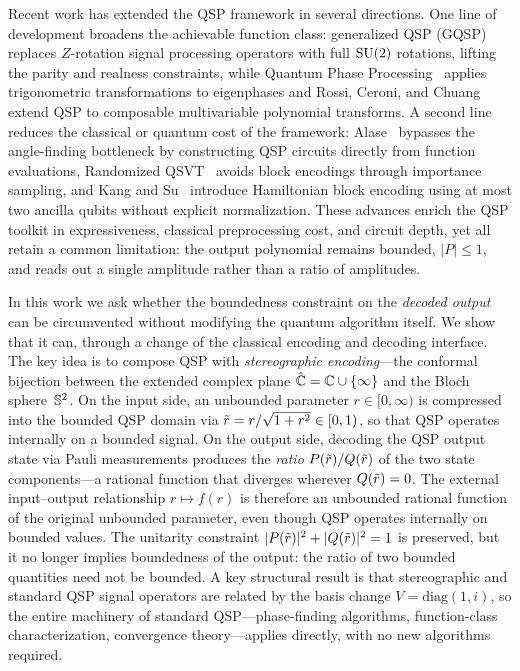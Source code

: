 
Recent work has extended the QSP framework in several directions.  One
line of development broadens the achievable function class: generalized
QSP (GQSP)~\cite{MotlaghWiebe2023} replaces $Z$-rotation signal
processing operators with full $\mathrm{SU}(2)$ rotations, lifting the parity
and realness constraints, while Quantum Phase
Processing~\cite{WangZhangYuWang2023} applies trigonometric
transformations to eigenphases and Rossi, Ceroni, and
Chuang~\cite{RossiCeroniChuang2025} extend QSP to composable
multivariable polynomial transforms.  A second line reduces the
classical or quantum cost of the framework:
Alase~\cite{Alase2025} bypasses the angle-finding bottleneck by
constructing QSP circuits directly from function evaluations,
Randomized QSVT~\cite{WangZhangHazraEtAl2025} avoids block encodings
through importance sampling, and Kang and Su~\cite{KangSu2025}
introduce Hamiltonian block encoding using at most two ancilla qubits
without explicit normalization.  These advances enrich the QSP toolkit
in expressiveness, classical preprocessing cost, and circuit depth,
yet all retain a common limitation: the output polynomial
remains bounded, $|P| \leq 1$, and reads out a single amplitude
rather than a ratio of amplitudes.


In this work we ask whether the boundedness constraint on the
\emph{decoded output} can be circumvented without modifying the
quantum algorithm itself.  We show that it can, through a change
of the classical encoding and decoding interface.
The key idea is to compose QSP with \emph{stereographic encoding}---the
conformal bijection between the extended complex plane
$\hat{\mathbb{C}} = \mathbb{C} \cup \{\infty\}$ and the Bloch
sphere~$\mathbb{S}^2$.  On the input side, an unbounded parameter
$r \in [0,\infty)$ is compressed into the bounded QSP domain via
$\tilde{r} = r/\sqrt{1+r^2} \in [0,1)$, so that QSP operates
internally on a bounded signal.  On the output side, decoding the QSP
output state via Pauli measurements produces the \emph{ratio}
$P(\tilde{r})/Q(\tilde{r})$ of the two state components---a rational
function that diverges wherever $Q(\tilde{r}) = 0$.  The external
input--output relationship $r \mapsto f(r)$ is therefore an unbounded
rational function of the original unbounded parameter, even though QSP
operates internally on bounded values.  The unitarity constraint
$|P(\tilde{r})|^2 + |Q(\tilde{r})|^2 = 1$ is preserved, but it no longer
implies boundedness of the output: the ratio of two bounded quantities
need not be bounded.  A key structural result is that stereographic
and standard QSP signal operators are related by the basis change
$V = \mathrm{diag}(1,i)$, so the entire machinery of standard
QSP---phase-finding algorithms, function-class characterization,
convergence theory---applies directly, with no new algorithms required.

